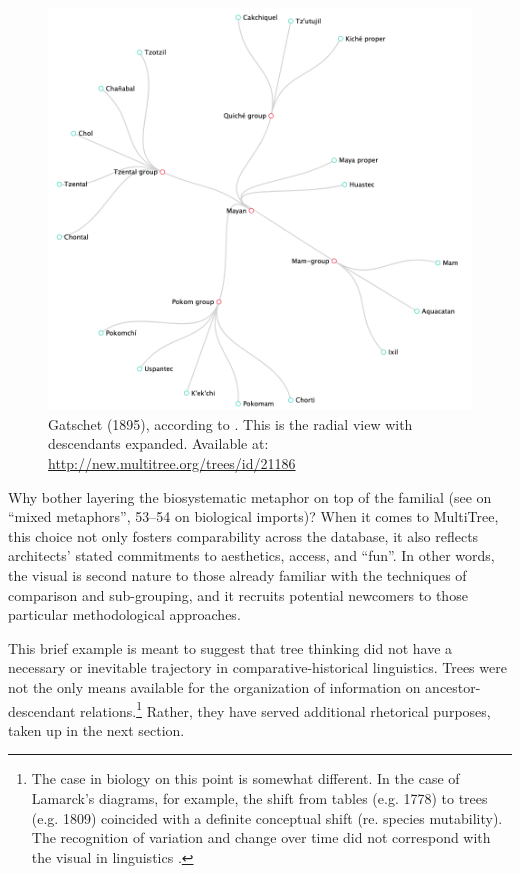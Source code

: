 \documentclass[output=paper]{langscibook}
\begin{document}
\begin{figure}
    \centering
    \includegraphics[width=\textwidth]{figures/gatschet1895-new.png}
    \caption{Gatschet (1895), according to \citet{GatschetCampbell1973}. This is the radial view with descendants expanded. Available at: \url{http://new.multitree.org/trees/id/21186}}
    \label{fig:kaplan:gatschet}
\end{figure}

Why bother layering the biosystematic metaphor on top of the familial (see \citealt[49]{Wells1987} on ``mixed metaphors'', 53--54 on biological imports)? When it comes to MultiTree, this choice not only fosters comparability across the data\-base, it also reflects architects' stated commitments to aesthetics, access, and ``fun''. In other words, the visual is second nature to those already familiar with the techniques of comparison and sub-grouping, and it recruits potential newcomers to those particular methodological approaches.

This brief example is meant to suggest that tree thinking did not have a necessary or inevitable trajectory in comparative-historical linguistics. Trees were not the only means available for the organization of information on ancestor-descendant relations.\footnote{The case in biology on this point is somewhat different. In the case of Lamarck's diagrams, for example, the shift from tables (e.g. 1778) to trees (e.g. 1809) coincided with a definite conceptual shift (re. species mutability). The recognition of variation and change over time did not correspond with the visual in linguistics \citep[chap. 3]{Archibald2014}.} Rather, they have served additional rhetorical purposes, taken up in the next section.
\end{document}
